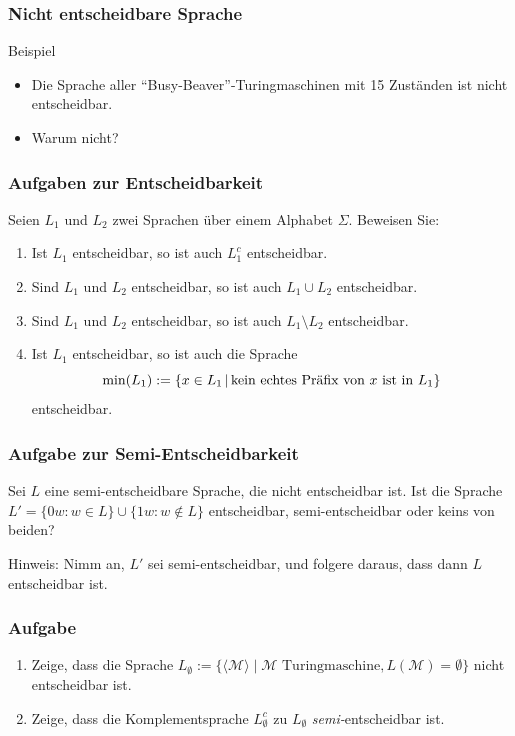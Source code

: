 \begin{frame}
 \frametitle{Nicht entscheidbare Sprache}
 \begin{block}{Beispiel}
 \begin{itemize}
  \item Die Sprache aller "`Busy-Beaver"'-Turingmaschinen mit 15 Zuständen ist nicht entscheidbar.
  \item Warum nicht?
 \end{itemize}
 \end{block}
\end{frame}

\begin{frame}
\frametitle{Aufgaben zur Entscheidbarkeit}
 Seien $L_1$ und $L_2$ zwei Sprachen über einem Alphabet $\Sigma$.
Beweisen Sie:
\begin{enumerate}
\item Ist $L_1$ entscheidbar, so ist auch $L_1^c$ entscheidbar.
\item Sind $L_1$ und $L_2$ entscheidbar, so ist auch $L_1\cup L_2$ entscheidbar.
\item Sind $L_1$ und $L_2$ entscheidbar, so ist auch $L_1\setminus L_2$ entscheidbar.
\item Ist $L_1$ entscheidbar, so ist auch die Sprache 
$$\min(L_1):=\left\lbrace x\in L_1 \,\middle\vert\, \text{kein echtes Präfix von $x$ ist in }L_1 \right\rbrace$$
entscheidbar.
\end{enumerate}
\end{frame}

\begin{frame}
 \frametitle{Aufgabe zur Semi-Entscheidbarkeit}
Sei $L$ eine semi-entscheidbare Sprache, die nicht entscheidbar ist. Ist die
Sprache $L'=\{0w:w \in L\} \cup \{1w: w \not\in L\}$ entscheidbar,
semi-entscheidbar oder keins von beiden?

Hinweis: Nimm an, $L'$ sei semi-entscheidbar, und folgere daraus, dass
dann $L$ entscheidbar ist. 
\end{frame}

\begin{frame}
   \frametitle{Aufgabe}
	\begin{enumerate}
\item Zeige, dass die Sprache $L_{\emptyset} := \{\langle \mathcal M \rangle \mid \mathcal M \text{ Turingmaschine}, L(\mathcal M) = \emptyset\}$ nicht entscheidbar ist.
\item Zeige, dass die Komplementsprache $L_{\emptyset}^c$ zu $L_{\emptyset}$ \emph{semi-}entscheidbar ist.
\end{enumerate}
\end{frame}


